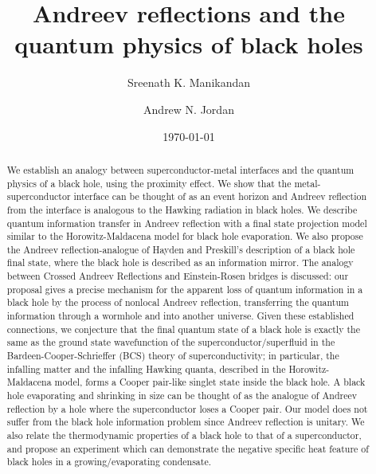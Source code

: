\documentclass[10pt,letterpaper,aps,onecolumn,superscriptaddress,floatfix,notitlepage]{revtex4-1}
\begin{document}
	\title{Andreev reflections and the quantum physics of black holes} \author{Sreenath K. Manikandan}
	\author{Andrew N. Jordan}
	\date{\today}
	
	\begin{abstract}
		We establish an analogy between superconductor-metal interfaces and the quantum physics of a black hole, using the proximity effect. We show that the metal-superconductor interface can be thought of as an event horizon and Andreev reflection from the interface is analogous to the Hawking radiation in black holes. We describe quantum information transfer in Andreev reflection with a final state projection model similar to the Horowitz-Maldacena model for black hole evaporation.  We also propose the Andreev reflection-analogue of Hayden and Preskill's description of a black hole final state, where the black hole is described as an information mirror. The analogy between Crossed Andreev Reflections and Einstein-Rosen bridges is discussed: our proposal gives a precise mechanism for the apparent loss of quantum information in a black hole by the process of nonlocal Andreev reflection, transferring the quantum information through a wormhole and into another universe. Given these established connections, we conjecture that the final quantum state of a black hole is exactly the same as the ground state wavefunction of the superconductor/superfluid in the Bardeen-Cooper-Schrieffer (BCS) theory of superconductivity; in particular, the infalling matter and the infalling Hawking quanta, described in the Horowitz-Maldacena model, forms a Cooper pair-like singlet state inside the black hole. A black hole evaporating and shrinking in size can be thought of as the analogue of Andreev reflection by a hole where the superconductor loses a Cooper pair. Our model does not suffer from the black hole information problem since Andreev reflection is unitary. We also relate the thermodynamic properties of a black hole to that of a superconductor, and propose an experiment which can demonstrate the negative specific heat feature of black holes in a growing/evaporating condensate.
	\end{abstract}
	
\end{document}
